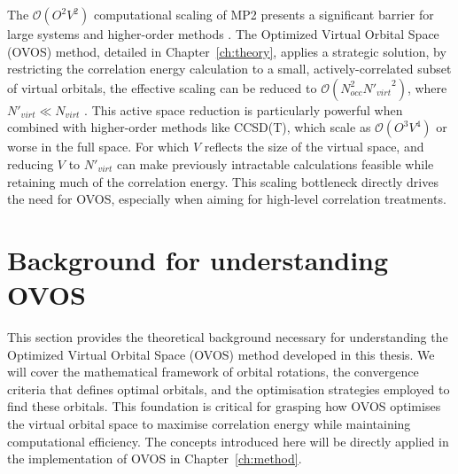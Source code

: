 The $\mathcal{O}(O^2V^2)$ computational scaling of MP2 presents a significant barrier for large systems and higher-order methods \cite{Jensen2017, Cao2019}. The Optimized Virtual Orbital Space (OVOS) method, detailed in Chapter~\ref{ch:theory}, applies a strategic solution, by restricting the correlation energy calculation to a small, actively-correlated subset of virtual orbitals, the effective scaling can be reduced to $\mathcal{O}(N_{occ}^2 {N'_{virt}}^2)$, where $N'_{virt} \ll N_{virt}$ \cite{Adamowicz1987}. This active space reduction is particularly powerful when combined with higher-order methods like CCSD(T), which scale as $\mathcal{O}(O^3V^4)$ or worse in the full space. For which $V$ reflects the size of the virtual space, and reducing $V$ to $N'_{virt}$ can make previously intractable calculations feasible while retaining much of the correlation energy. This scaling bottleneck directly drives the need for OVOS, especially when aiming for high‑level correlation treatments.


































\section{Background for understanding OVOS}
\label{sec:theory_background_ovos}

This section provides the theoretical background necessary for understanding the Optimized Virtual Orbital Space (OVOS) method developed in this thesis. We will cover the mathematical framework of orbital rotations, the convergence criteria that defines optimal orbitals, and the optimisation strategies employed to find these orbitals. This foundation is critical for grasping how OVOS optimises the virtual orbital space to maximise correlation energy while maintaining computational efficiency. The concepts introduced here will be directly applied in the implementation of OVOS in Chapter~\ref{ch:method}.


